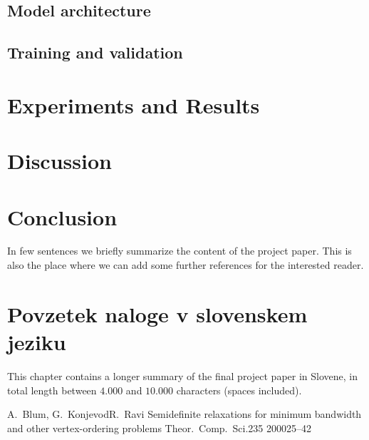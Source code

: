 \documentclass[12pt,a4paper,titlepage,openany]{report}
\begin{document}
\section{Model architecture}

\section{Training and validation}



\chapter{Experiments and Results}
\thispagestyle{fancy}




\chapter{Discussion}
\thispagestyle{fancy}




\chapter{Conclusion}
\thispagestyle{fancy}

In few sentences we briefly summarize the content of the project paper.
This is also the place where we can add some further references for the interested reader.



\chapter{Povzetek naloge v slovenskem jeziku}
\thispagestyle{fancy}

This chapter contains a longer summary of the final project paper in Slovene,
in total length between $4.000$ and $10.000$ characters (spaces included).


 \begin{thebibliography}{99}
\thispagestyle{fancy}

  \articleInJournalManyAuthors
    {A.~Blum, G.~Konjevod}{R.~Ravi}
    {Semidefinite relaxations for minimum bandwidth and other vertex-ordering problems}
   {Theor.~Comp.~Sci.}{235}
   {2000}{25--42}

\end{thebibliography}
\newpage
\end{document}

